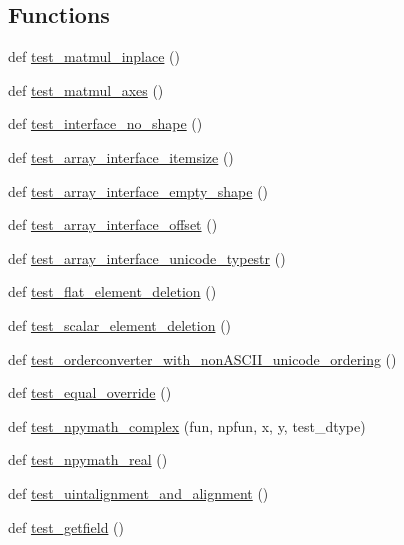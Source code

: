 \subsection*{Functions}
\begin{DoxyCompactItemize}
\item 
def \hyperlink{namespacenumpy_1_1core_1_1tests_1_1test__multiarray_a8bac228872989ec2c737f64ebf58d07c}{test\+\_\+matmul\+\_\+inplace} ()
\item 
def \hyperlink{namespacenumpy_1_1core_1_1tests_1_1test__multiarray_ad0c07fdd8cd17c5286dca6b04e566ff6}{test\+\_\+matmul\+\_\+axes} ()
\item 
def \hyperlink{namespacenumpy_1_1core_1_1tests_1_1test__multiarray_aca4bf1a3d76f1101916ed861b14d4074}{test\+\_\+interface\+\_\+no\+\_\+shape} ()
\item 
def \hyperlink{namespacenumpy_1_1core_1_1tests_1_1test__multiarray_a82c9ea65989bb656f477af18aacdd2a6}{test\+\_\+array\+\_\+interface\+\_\+itemsize} ()
\item 
def \hyperlink{namespacenumpy_1_1core_1_1tests_1_1test__multiarray_ae4c5d603fce4df64b1bce32c6f50fc04}{test\+\_\+array\+\_\+interface\+\_\+empty\+\_\+shape} ()
\item 
def \hyperlink{namespacenumpy_1_1core_1_1tests_1_1test__multiarray_a9edb139d159bf683ea9db75afc1e19ec}{test\+\_\+array\+\_\+interface\+\_\+offset} ()
\item 
def \hyperlink{namespacenumpy_1_1core_1_1tests_1_1test__multiarray_a221e600eb6c2b166e9898e76d343bcaa}{test\+\_\+array\+\_\+interface\+\_\+unicode\+\_\+typestr} ()
\item 
def \hyperlink{namespacenumpy_1_1core_1_1tests_1_1test__multiarray_adcb1a40301e18a66fa3def0e6fbf162b}{test\+\_\+flat\+\_\+element\+\_\+deletion} ()
\item 
def \hyperlink{namespacenumpy_1_1core_1_1tests_1_1test__multiarray_a243df73702343a316e6b6276a6855461}{test\+\_\+scalar\+\_\+element\+\_\+deletion} ()
\item 
def \hyperlink{namespacenumpy_1_1core_1_1tests_1_1test__multiarray_aa285778ea4e4ebd249ba3051cbd19261}{test\+\_\+orderconverter\+\_\+with\+\_\+non\+A\+S\+C\+I\+I\+\_\+unicode\+\_\+ordering} ()
\item 
def \hyperlink{namespacenumpy_1_1core_1_1tests_1_1test__multiarray_a1f875eae98179d8049f4e2c1b27da14d}{test\+\_\+equal\+\_\+override} ()
\item 
def \hyperlink{namespacenumpy_1_1core_1_1tests_1_1test__multiarray_a2330aea672392c9e6fd8947f6b21a0e1}{test\+\_\+npymath\+\_\+complex} (fun, npfun, x, y, test\+\_\+dtype)
\item 
def \hyperlink{namespacenumpy_1_1core_1_1tests_1_1test__multiarray_a2bb02f876917dd17a902605d69a5e281}{test\+\_\+npymath\+\_\+real} ()
\item 
def \hyperlink{namespacenumpy_1_1core_1_1tests_1_1test__multiarray_a1c9abc01702784fdba8cdfd67d472fb7}{test\+\_\+uintalignment\+\_\+and\+\_\+alignment} ()
\item 
def \hyperlink{namespacenumpy_1_1core_1_1tests_1_1test__multiarray_ac04f0f9acf4c1cf5c2a3aa1e2c8e45b0}{test\+\_\+getfield} ()
\end{DoxyCompactItemize}

